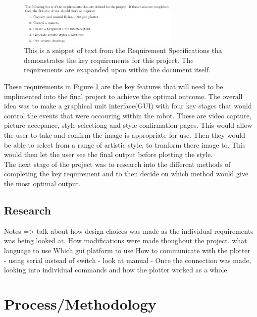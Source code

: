 \documentclass{article}
\begin{document}
 \begin{figure}[h]
    \centering
    \includegraphics[width=0.7\textwidth]{requirements.png}
    \caption{This is a snippet of text from the Requirement Specifications\cite{Requirement_specifications} tha demonstrates the key requirements for this project. The requirements are exapanded upon within the document itself.}
    \label{fig:requirements}
	\end{figure}

These requirements in Figure \ref{fig:requirements} are the key features that will need to be implimented into the final project to achieve the optimal outcome. The overall idea was to make a graphical unit interface(GUI) with four key stages that would control the events that were occouring within the robot. These are video capture, picture accepance, style selectiong and style confirmation pages. This would allow the user to take and confirm the image is appropriate for use. Then they would be able to select from a range of artistic style, to tranform there image to. This would then let the user see the final output before plotting the style.\\ \newline
The next stage of the project was to research into the different methods of completing the key requirement and to then decide on which method would give the most optimal output.\\ \newline
\clearpage
	\subsection{Research}
	Notes =>  talk about how design choices was made as the individual requirements was being looked at. How modifications were made thoughout the project.
	what language to use
 	Which gui platform to use
 	How to communicate with the plotter - using serial instead of switch - look at 		
 						manual
 			- Once the connection was made, looking into individual commands and how 	
 			the plotter worked as a whole.
  	
 	
	\clearpage
	\section{Process/Methodology}
	
\end{document}
